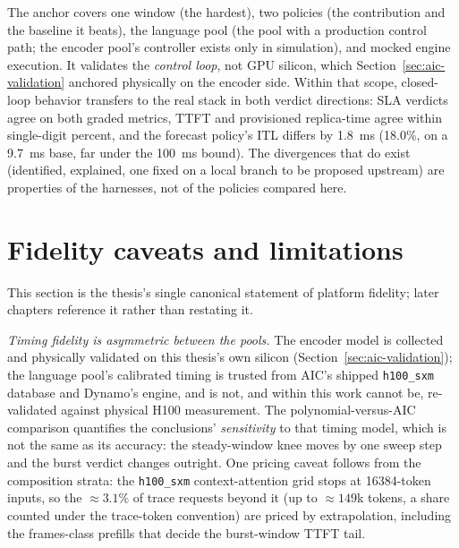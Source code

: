 The anchor covers one window (the hardest), two policies (the contribution
and the baseline it beats), the language pool (the pool with a production
control path; the encoder pool's controller exists only in simulation), and
mocked engine execution. It validates the \emph{control loop}, not GPU
silicon, which Section~\ref{sec:aic-validation} anchored physically on the
encoder side. Within that scope, closed-loop
behavior transfers to the real stack in both verdict directions: SLA
verdicts agree on both graded metrics, TTFT and provisioned replica-time
agree within single-digit percent, and the forecast policy's ITL differs by
\SI{1.8}{\milli\second} (18.0\%, on a \SI{9.7}{\milli\second} base, far under
the \SI{100}{\milli\second} bound). The divergences that do exist
(identified, explained, one fixed on a local branch to be proposed upstream)
are properties of the harnesses, not of the policies compared here.

\section{Fidelity caveats and limitations}
\label{sec:sim-limitations}

This section is the thesis's single canonical statement of platform
fidelity; later chapters reference it rather than restating it.

\emph{Timing fidelity is asymmetric between the pools.} The encoder model is
collected and physically validated on this thesis's own silicon
(Section~\ref{sec:aic-validation}); the language pool's calibrated timing is
trusted from AIC's shipped \texttt{h100\_sxm} database and Dynamo's engine,
and is not, and within this work cannot be, re-validated against
physical H100 measurement. The polynomial-versus-AIC comparison quantifies
the conclusions' \emph{sensitivity} to that timing model, which is not the
same as its accuracy: the steady-window knee moves by one sweep step and the
burst verdict changes outright. One pricing caveat follows from the
composition strata: the \texttt{h100\_sxm} context-attention grid stops at
\num{16384}-token inputs, so the ${\approx}3.1\%$ of trace requests beyond
it (up to ${\approx}149$k tokens, a share counted under the trace-token
convention) are priced by extrapolation, including the frames-class
prefills that decide the burst-window TTFT tail.

